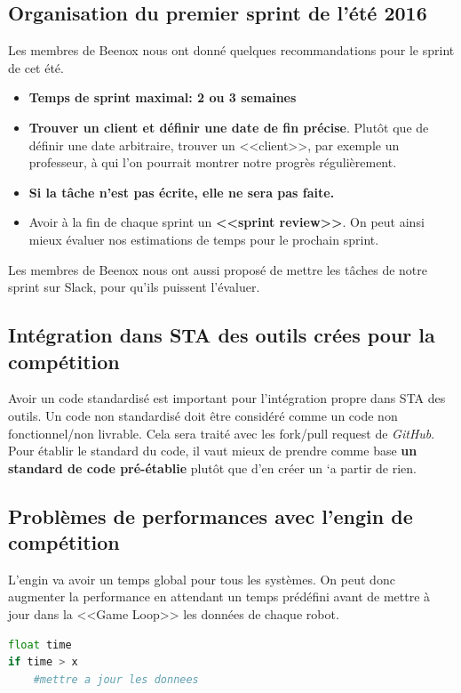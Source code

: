 \documentclass[12pt,letterpaper,twoside]{article}
\begin{document}
\subsection*{Organisation du premier sprint de l'été 2016}
Les membres de Beenox nous ont donné quelques recommandations pour le sprint de cet été.
\begin{itemize}
\item \textbf{Temps de sprint maximal: 2 ou 3 semaines}
\item \textbf{Trouver un client et définir une date de fin précise}.
Plut\^ot que de définir une date arbitraire, trouver un <<client>>, par exemple un professeur, \`a qui l'on pourrait montrer notre progr\`es régulièrement.
\item \textbf{Si la tâche n'est pas écrite, elle ne sera pas faite.}
\item Avoir à la fin de chaque sprint un \textbf{<<sprint review>>}.
On peut ainsi mieux évaluer nos estimations de temps pour le prochain sprint.
\end{itemize}
Les membres de Beenox nous ont aussi proposé de mettre les tâches de notre sprint sur Slack, pour qu'ils puissent l'évaluer.

\subsection*{Intégration dans STA des outils crées pour la compétition}
Avoir un code standardisé est important pour l'intégration propre dans STA des outils.
Un code non standardisé doit \^etre considéré comme un code non fonctionnel/non livrable.
Cela sera traité avec les fork/pull request de \textit{GitHub}.
\\
Pour établir le standard du code, il vaut mieux de prendre comme base \textbf{un standard de code pré-établie} plut\^ot que d'en créer un `a partir de rien.

\subsection*{Probl\`emes de performances avec l'engin de compétition}
L'engin va avoir un temps global pour tous les systèmes.
On peut donc augmenter la performance en attendant un temps prédéfini avant de mettre à jour dans la <<Game Loop>> les données de chaque robot.

\begin{lstlisting}[language = python]
float time
if time > x
	#mettre a jour les donnees
\end{lstlisting}
\end{document}
